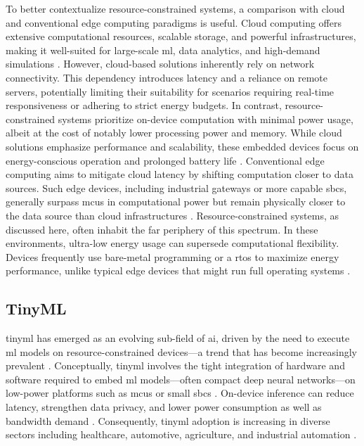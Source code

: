 To better contextualize resource-constrained systems, a comparison with cloud and conventional edge computing paradigms is useful. Cloud computing offers extensive computational resources, scalable storage, and powerful infrastructures, making it well-suited for large-scale \gls{ml}, data analytics, and high-demand simulations \cite{changSurveyRecentAdvances2021}. However, cloud-based solutions inherently rely on network connectivity. This dependency introduces latency and a reliance on remote servers, potentially limiting their suitability for scenarios requiring real-time responsiveness or adhering to strict energy budgets. In contrast, resource-constrained systems prioritize on-device computation with minimal power usage, albeit at the cost of notably lower processing power and memory. While cloud solutions emphasize performance and scalability, these embedded devices focus on energy-conscious operation and prolonged battery life \cite{banburyBenchmarkingTinyMLSystems2021, changSurveyRecentAdvances2021}. Conventional edge computing aims to mitigate cloud latency by shifting computation closer to data sources. Such edge devices, including industrial gateways or more capable \glspl{sbc}, generally surpass \glspl{mcu} in computational power but remain physically closer to the data source than cloud infrastructures \cite{capogrossoMachineLearningOrientedSurvey2024}. Resource-constrained systems, as discussed here, often inhabit the far periphery of this spectrum. In these environments, ultra-low energy usage can supersede computational flexibility. Devices frequently use bare-metal programming or a \gls{rtos} to maximize energy performance, unlike typical edge devices that might run full operating systems \cite{brancoMachineLearningResourceScarce2019}.

\subsection{TinyML}
\label{subsec:tinyml}

\Gls{tinyml} has emerged as an evolving sub-field of \gls{ai}, driven by the need to execute \gls{ml} models on resource-constrained devices—a trend that has become increasingly prevalent \cite{zaidiUnlockingEdgeIntelligence2022, capogrossoMachineLearningOrientedSurvey2024}. Conceptually, \gls{tinyml} involves the tight integration of hardware and software required to embed \gls{ml} models—often compact deep neural networks—on low-power platforms such as \glspl{mcu} or small \glspl{sbc} \cite{duttaTinyMLMeetsIoT2021, tsoukasReviewEmergingTechnology2024}. On-device inference can reduce latency, strengthen data privacy, and lower power consumption as well as bandwidth demand \cite{immonenTinyMachineLearning2022, tsoukasReviewEmergingTechnology2024, gillEdgeAITaxonomy2024}. Consequently, \gls{tinyml} adoption is increasing in diverse sectors including healthcare, automotive, agriculture, and industrial automation \cite{tsoukasReviewEmergingTechnology2024, gillEdgeAITaxonomy2024}.

